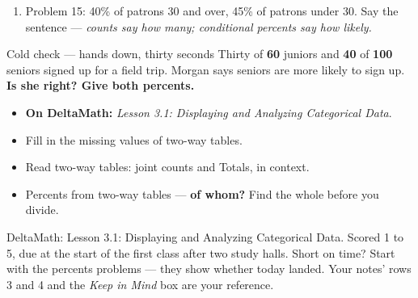 \documentclass[aspectratio=169, 11pt]{beamer}
\begin{document}
\begin{frame}[t, plain]
  \vspace{4pt}
  \begin{enumerate}\setlength{\itemsep}{5pt}
    \item Problem 15: 40\% of patrons 30 and over, 45\% of patrons under 30. Say the sentence ---
          \emph{counts say how many; conditional percents say how likely.}
  \end{enumerate}
  \vspace{6pt}
  \begin{block}{Cold check --- hands down, thirty seconds}
    Thirty of \textbf{60} juniors and \textbf{40} of \textbf{100} seniors signed up for a field
    trip. Morgan says seniors are more likely to sign up. \textbf{Is she right? Give both
    percents.}
  \end{block}
\end{frame}

\begin{frame}[t, plain]
  \begin{itemize}\setlength{\itemsep}{5pt}
    \item \textbf{On DeltaMath:} \emph{Lesson 3.1: Displaying and Analyzing Categorical Data}.
    \item Fill in the missing values of two-way tables.
    \item Read two-way tables: joint counts and Totals, in context.
    \item Percents from two-way tables --- \textbf{of whom?} Find the whole before you divide.
  \end{itemize}
  \begin{block}{DeltaMath: Lesson 3.1: Displaying and Analyzing Categorical Data. Scored 1 to 5, due at the start of the first class after two study halls.}
    Short on time? Start with the percents problems --- they show whether today landed. Your
    notes' rows 3 and 4 and the \emph{Keep in Mind} box are your reference.
  \end{block}
\end{frame}
\end{document}
